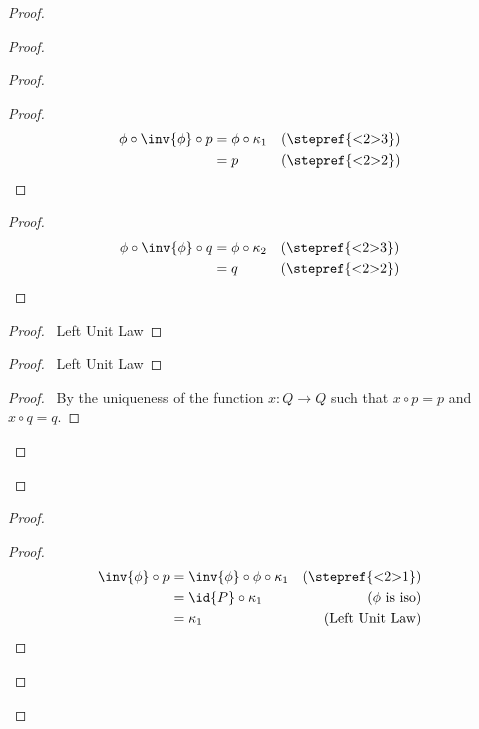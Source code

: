 \begin{proof}
\begin{proof}
    \begin{proof}
      \begin{proof}
        \pf
        \begin{align*}
          \phi \circ \inv{\phi} \circ p & = \phi \circ \kappa_1 & (\text{\stepref{<2>3}})\\
          & = p & (\text{\stepref{<2>2}})
        \end{align*}
      \end{proof}
      \begin{proof}
        \pf
        \begin{align*}
          \phi \circ \inv{\phi} \circ q & = \phi \circ \kappa_2 & (\text{\stepref{<2>3}})\\
          & = q & (\text{\stepref{<2>2}})
        \end{align*}
      \end{proof}
      \begin{proof}
        \pf\ Left Unit Law
      \end{proof}
      \begin{proof}
        \pf\ Left Unit Law
      \end{proof}
      \qedstep
      \begin{proof}
        \pf\ By the uniqueness of the function $x : Q \rightarrow Q$ such that $x \circ p = p$ and $x \circ q = q$.
      \end{proof}
    \end{proof}
  \end{proof}
  \begin{proof}
    \begin{proof}
      \pf
      \begin{align*}
        \inv{\phi} \circ p & = \inv{\phi} \circ \phi \circ \kappa_1 & (\text{\stepref{<2>1}}) \\
        & = \id{P} \circ \kappa_1 & (\text{$\phi$ is iso})\\
        & = \kappa_1 & (\text{Left Unit Law})
      \end{align*}

\end{proof}
\end{proof}
\end{proof}
